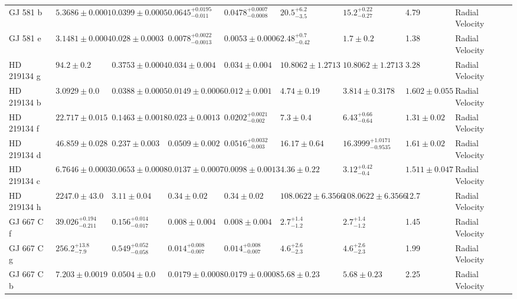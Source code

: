 \begin{tabular}{llllllllll}
GJ 581 b & $5.3686 \pm 0.0001$ & $0.0399 \pm 0.0005$ & $0.0645^{+0.0195}_{-0.011}$ & $0.0478^{+0.0007}_{-0.0008}$ & $20.5^{+6.2}_{-3.5}$ & $15.2^{+0.22}_{-0.27}$ & 4.79 & Radial Velocity & \cite{VON_STAUFFENBERG_ET_AL__2024} \\
GJ 581 e & $3.1481 \pm 0.0004$ & $0.028 \pm 0.0003$ & $0.0078^{+0.0022}_{-0.0013}$ & $0.0053 \pm 0.0006$ & $2.48^{+0.7}_{-0.42}$ & $1.7 \pm 0.2$ & 1.38 & Radial Velocity & \cite{VON_STAUFFENBERG_ET_AL__2024} \\
HD 219134 g & $94.2 \pm 0.2$ & $0.3753 \pm 0.0004$ & $0.034 \pm 0.004$ & $0.034 \pm 0.004$ & $10.8062 \pm 1.2713$ & $10.8062 \pm 1.2713$ & 3.28 & Radial Velocity & \cite{VOGT_ET_AL__2015} \\
HD 219134 b & $3.0929 \pm 0.0$ & $0.0388 \pm 0.0005$ & $0.0149 \pm 0.0006$ & $0.012 \pm 0.001$ & $4.74 \pm 0.19$ & $3.814 \pm 0.3178$ & $1.602 \pm 0.055$ & Radial Velocity & \cite{GILLON_ET_AL__2017} \\
HD 219134 f & $22.717 \pm 0.015$ & $0.1463 \pm 0.0018$ & $0.023 \pm 0.0013$ & $0.0202^{+0.0021}_{-0.002}$ & $7.3 \pm 0.4$ & $6.43^{+0.66}_{-0.64}$ & $1.31 \pm 0.02$ & Radial Velocity & \cite{GILLON_ET_AL__2017} \\
HD 219134 d & $46.859 \pm 0.028$ & $0.237 \pm 0.003$ & $0.0509 \pm 0.002$ & $0.0516^{+0.0032}_{-0.003}$ & $16.17 \pm 0.64$ & $16.3999^{+1.0171}_{-0.9535}$ & $1.61 \pm 0.02$ & Radial Velocity & \cite{GILLON_ET_AL__2017} \\
HD 219134 c & $6.7646 \pm 0.0003$ & $0.0653 \pm 0.0008$ & $0.0137 \pm 0.0007$ & $0.0098 \pm 0.0013$ & $4.36 \pm 0.22$ & $3.12^{+0.42}_{-0.4}$ & $1.511 \pm 0.047$ & Radial Velocity & \cite{GILLON_ET_AL__2017} \\
HD 219134 h & $2247.0 \pm 43.0$ & $3.11 \pm 0.04$ & $0.34 \pm 0.02$ & $0.34 \pm 0.02$ & $108.0622 \pm 6.3566$ & $108.0622 \pm 6.3566$ & 12.7 & Radial Velocity & \cite{VOGT_ET_AL__2015} \\
GJ 667 C f & $39.026^{+0.194}_{-0.211}$ & $0.156^{+0.014}_{-0.017}$ & $0.008 \pm 0.004$ & $0.008 \pm 0.004$ & $2.7^{+1.4}_{-1.2}$ & $2.7^{+1.4}_{-1.2}$ & 1.45 & Radial Velocity & \cite{ANGLADA_ESCUDE_ET_AL__2013} \\
GJ 667 C g & $256.2^{+13.8}_{-7.9}$ & $0.549^{+0.052}_{-0.058}$ & $0.014^{+0.008}_{-0.007}$ & $0.014^{+0.008}_{-0.007}$ & $4.6^{+2.6}_{-2.3}$ & $4.6^{+2.6}_{-2.3}$ & 1.99 & Radial Velocity & \cite{ANGLADA_ESCUDE_ET_AL__2013} \\
GJ 667 C b & $7.203 \pm 0.0019$ & $0.0504 \pm 0.0$ & $0.0179 \pm 0.0008$ & $0.0179 \pm 0.0008$ & $5.68 \pm 0.23$ & $5.68 \pm 0.23$ & 2.25 & Radial Velocity & \cite{BONFILS_ET_AL__2013} \\

\end{tabular}
